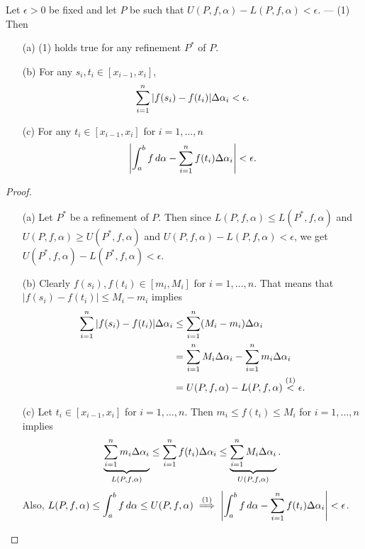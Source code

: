 \documentclass[]{article}
\begin{document}
\begin{theorem}
	\label{thm-6-7}
	Let $\epsilon>0$ be fixed and let $P$ be such that $U(P,f,\alpha)-L(P,f,\alpha) < \epsilon$. --- (1) Then
	\begin{enumerate}
		\item[(a)] (1) holds true for any refinement $P^*$ of $P$.
		\item[(b)] For any $s_i,t_i\in[x_{i-1},x_i]$,
			$$\ds\sum_{i=1}^n|f(s_i)-f(t_i)|\Delta\alpha_i<\epsilon.$$
		\item[(c)] For any $t_i\in[x_{i-1},x_i]$ for $i=1,\dots,n$
			$$\ds \mlr{\int_a^bf\,d\alpha - \sum_{i=1}^nf(t_i)\Delta\alpha_i} < \epsilon.$$
	\end{enumerate}
\end{theorem}
\begin{proof}
	\begin{enumerate}
		\item[(a)] Let $P^*$ be a refinement of $P$. Then since $L(P,f,\alpha)\leq L(P^*,f,\alpha)$ and $U(P,f,\alpha) \geq U(P^*,f,\alpha)$ and $U(P,f,\alpha)-L(P,f,\alpha)<\epsilon$, we get $U(P^*,f,\alpha)-L(P^*,f,\alpha)<\epsilon$.
		\item[(b)] Clearly $f(s_i),f(t_i)\in[m_i,M_i]$ for $i=1,\dots,n$.
			That means that $|f(s_i)-f(t_i)|\leq M_i-m_i$ implies
			\begin{align*}
				\sum_{i=1}^n |f(s_i)-f(t_i)|\Delta\alpha_i 
				&\leq \sum_{i=1}^n (M_i-m_i)\Delta\alpha_i \\
				&= \sum_{i=1}^n M_i\Delta\alpha_i - \sum_{i=1}^n m_i\Delta\alpha_i \\
				&= U(P,f,\alpha) - L(P,f,\alpha) \os{(1)}<\epsilon.
			\end{align*}
		\item[(c)] Let $t_i\in[x_{i-1},x_i]$ for $i=1,\dots,n$. Then $m_i\leq f(t_i)\leq M_i$ for $i=1,\dots,n$ implies
			$$ \ub{L(P,f,\alpha)}{\sum_{i=1}^n m_i \Delta\alpha_i} \leq \sum_{i=1}^n f(t_i)\Delta\alpha_i \leq \ub{U(P,f,\alpha)}{\sum_{i=1}^n M_i\Delta\alpha_i}. $$
			Also, $\ds L(P,f,\alpha) \leq \int_a^bf\,d\alpha \leq U(P,f,\alpha) \os{(1)}\implies \mlr{\int_a^bf\,d\alpha - \sum_{i=1}^n f(t_i)\Delta\alpha_i} < \epsilon$.
	\end{enumerate}
\end{proof}
\end{document}
